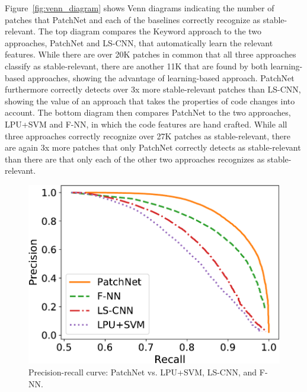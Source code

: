 Figure~\ref{fig:venn_diagram} shows Venn diagrams indicating the number of patches that PatchNet and each of the baselines correctly recognize as stable-relevant. The top diagram compares the Keyword approach to the two approaches, PatchNet and LS-CNN, that automatically learn the relevant features.  While there are over 20K patches in common that all three approaches classify as stable-relevant, there are another 11K that are
found by both learning-based approaches, showing the advantage of
learning-based approach.  PatchNet furthermore correctly detects over 3x
more stable-relevant patches than LS-CNN, showing the value of an approach
that takes the properties of code changes into account.  The bottom diagram
then compares PatchNet to the two approaches, LPU+SVM and F-NN, in which
the code features are hand crafted.  While all three approaches correctly
recognize over 27K patches as stable-relevant, there are again 3x more
patches that only PatchNet correctly detects as stable-relevant than there
are that only each of the other two approaches recognizes as stable-relevant.

\begin{figure}
\centering
\includegraphics[scale=0.375]{figures/prc_recall_curve_ver1.pdf}
	\caption{Precision-recall curve: PatchNet vs. LPU+SVM, LS-CNN, and F-NN.}
	\label{fig:prc_rc_curve}
    \vspace{-0.4cm}
\end{figure}

